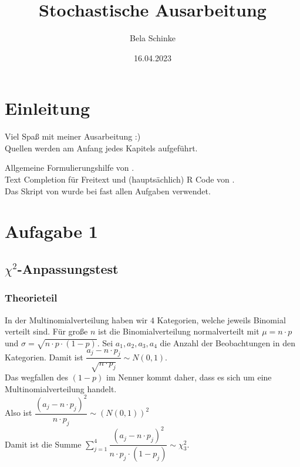 \documentclass[]{article}
\title{Stochastische Ausarbeitung}
\author{Bela Schinke}
\date{16.04.2023}
\begin{document}
\maketitle

{
\setcounter{tocdepth}{2}
\tableofcontents
}
\hypertarget{einleitung}{%
\section{Einleitung}\label{einleitung}}

Viel Spaß mit meiner Ausarbeitung :)\\
Quellen werden am Anfang jedes Kapitels aufgeführt.

Allgemeine Formulierungshilfe von \citep{ChatGPT}.\\
Text Completion für Freitext und (hauptsächlich) R Code von \citep{GithubCopilot}.\\
Das Skript von \citep{skript} wurde bei fast allen Aufgaben verwendet.

\hypertarget{aufagabe-1}{%
\section{Aufagabe 1}\label{aufagabe-1}}

\hypertarget{chi2-anpassungstest}{%
\subsection{\texorpdfstring{\(\chi^2\)-Anpassungstest}{\textbackslash{}chi\^{}2-Anpassungstest}}\label{chi2-anpassungstest}}

\hypertarget{theorieteil}{%
\subsubsection{Theorieteil}\label{theorieteil}}

\citep{wikipediaChi2}

In der Multinomialverteilung haben wir \(4\) Kategorien, welche jeweils Binomial verteilt sind.
Für große \(n\) ist die Binomialverteilung normalverteilt mit \(\mu = n \cdot p\) und \(\sigma = \sqrt{n \cdot p \cdot (1-p)}\).
Sei \(a_1, a_2, a_3, a_4\) die Anzahl der Beobachtungen in den Kategorien. Damit ist \(\dfrac{a_j-n \cdot p_j}{\sqrt{n \cdot p_j}}\sim N(0,1)\).\\
Das wegfallen des \((1-p)\) im Nenner kommt daher, dass es sich um eine Multinomialverteilung handelt.\\
Also ist \(\dfrac{(a_j-n \cdot p_j)^2}{n \cdot p_j}\sim (N(0,1))^2\)\\
Damit ist die Summe \(\sum_{j=1}^4 \dfrac{(a_j-n \cdot p_j)^2}{n \cdot p_j \cdot (1-p_j)}\sim \chi^2_3\).
\end{document}
